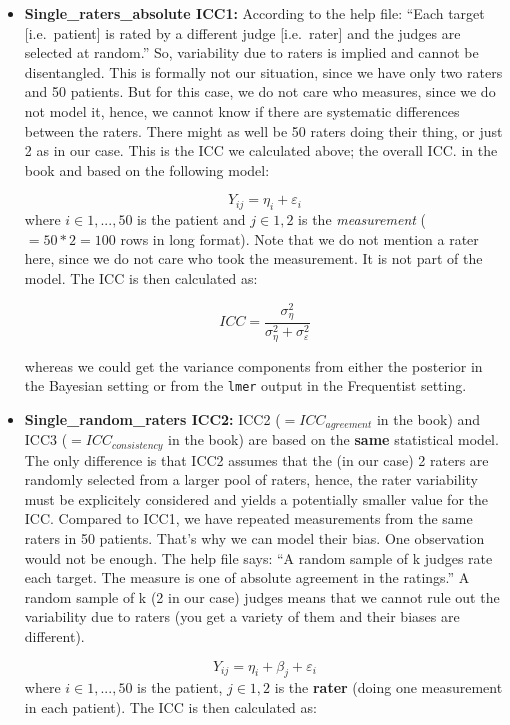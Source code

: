 \documentclass[
]{book}
\begin{document}
\begin{itemize}
\item
  \textbf{Single\_raters\_absolute ICC1:}
  According to the help file: ``Each target {[}i.e.~patient{]} is rated by a different
  judge {[}i.e.~rater{]} and the judges are selected at random.'' So, variability due to raters
  is implied and cannot be disentangled.
  This is formally not our situation, since we have only two raters and
  50 patients. But for this case, we do not care who measures, since we do not
  model it, hence, we cannot know if there are systematic differences between
  the raters. There might as well be 50 raters doing their thing, or just 2 as in our case.
  This is the ICC we calculated above; the overall ICC.
  in the book and based on the following model:

  \[Y_{ij} = \eta_i + \varepsilon_i\]
  where \(i \in {1,...,50}\) is the patient and \(j \in {1,2}\) is the \emph{measurement}
  (\(=50*2=100\) rows in long format).
  Note that we do not mention a rater here, since we do not care who took the
  measurement. It is not part of the model. The ICC is then calculated as:

  \[ICC = \frac{\sigma_{\eta}^2}{\sigma_{\eta}^2 + \sigma_{\varepsilon}^2}\]

  whereas we could get the variance components from either the posterior in the Bayesian
  setting or from the \texttt{lmer} output in the Frequentist setting.
\item
  \textbf{Single\_random\_raters ICC2:}
  ICC2 (\(=ICC_{agreement}\) in the book) and ICC3 (\(=ICC_{consistency}\) in the book)
  are based on the \textbf{same} statistical model. The only difference is
  that ICC2 assumes that the (in our case) 2 raters are randomly selected from a larger pool of raters,
  hence, the rater variability must be explicitely considered and yields a potentially smaller
  value for the ICC. Compared to ICC1, we have repeated measurements from the same raters
  in 50 patients. That's why we can model their bias. One observation would not be enough.
  The help file says: ``A random sample of k judges rate each target.
  The measure is one of absolute agreement in the ratings.''
  A random sample of k (2 in our case) judges means that we cannot rule out the variability
  due to raters (you get a variety of them and their biases are different).

  \[Y_{ij} = \eta_i + \beta_j + \varepsilon_i\]
  where \(i \in {1,...,50}\) is the patient, \(j \in {1,2}\) is the \textbf{rater}
  (doing one measurement in each patient). The ICC is then calculated as:


\end{itemize}
\end{document}
